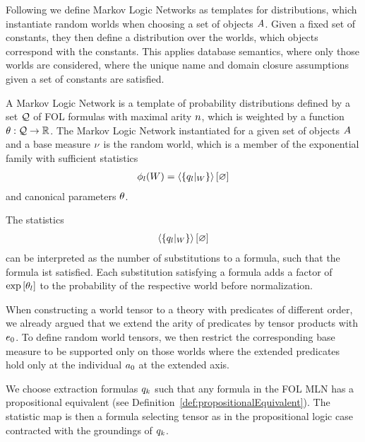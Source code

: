 Following \cite{domingos_markov_2006} we define Markov Logic Networks as templates for distributions, which instantiate random worlds when choosing a set of objects $A$.
Given a fixed set of constants, they then define a distribution over the worlds, which objects correspond with the constants. %
This applies database semantics, where only those worlds are considered, where the unique name and domain closure assumptions given a set of constants are satisfied.


\begin{definition}
	A Markov Logic Network is a template of probability distributions defined by a set $\mathcal{Q}$ of FOL formulas with maximal arity $n$, which is weighted by a function $\theta:\mathcal{Q} \rightarrow \mathbb{R}$.
	The Markov Logic Network instantiated for a given set of objects $A$ and a base measure $\nu$ is the random world, which is a member of the exponential family with sufficient statistics
	\begin{align*}
		\sstat_{\statenumerator}(\dataworld)  = \sbcontraction{\groundingof{\folexformula_\statenumerator}} %
	\end{align*}
	and canonical parameters $\theta$.
\end{definition}

The statistics
	\begin{align*}
		\sbcontraction{\groundingof{\folexformula_\statenumerator}} %
	\end{align*}
can be interpreted as the number of substitutions to a formula, such that the formula ist satisfied.
Each substitution satisfying a formula adds a factor of $\mathrm{exp}\left[\theta_l\right]$ to the probability of the respective world before normalization.


%
When constructing a world tensor to a theory with predicates of different order, we already argued that we extend the arity of predicates by tensor products with $e_{0}$.
To define random world tensors, we then restrict the corresponding base measure to be supported only on those worlds where the extended predicates hold only at the individual $a_{0}$ at the extended axis.



We choose extraction formulas $q_{k}$ such that any formula in the FOL MLN has a propositional equivalent (see Definition~\ref{def:propositionalEquivalent}).
The statistic map is then a formula selecting tensor as in the propositional logic case contracted with the groundings of $q_{k}$.




